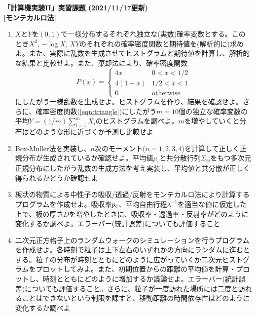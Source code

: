 \documentclass[11pt]{jarticle}
\begin{document}
\noindent
{\bf\large 「計算機実験II」実習課題 (2021/11/17更新)}
\\[-0.5em]

{\bf [モンテカルロ法]}
\begin{enumerate}

\item $X$と$Y$を$(0,1)$で一様分布するそれぞれ独立な(実数)確率変数とする。このとき$X^2$, $-\log X$, $XY$のそれぞれの確率密度関数と期待値を(解析的に)求めよ。また、実際に乱数を生成させてヒストグラムと期待値を計算し、解析的な結果と比較せよ。また、棄却法により、確率密度関数
  \begin{equation}
    P(x) = \begin{cases} 4x & 0 < x < 1/2 \\
      4(1-x) & 1/2 < x < 1 \\
      0 & \text{otherwise}
    \end{cases}
    \label{eqn:triangle}
  \end{equation}
  にしたがう一様乱数を生成せよ。ヒストグラムを作り、結果を確認せよ。さらに、確率密度関数(\ref{eqn:triangle})にしたがう$m=10$個の独立な確率変数の平均$Y=(1/m) \sum_{i=1}^m X_i$のヒストグラムを調べよ。$m$を増やしていくと分布はどのような形に近づくか予測し比較せよ
  
\item Box-Muller法を実装し、$n$次のモーメント($n=1,2,3,4$)を計算して正しく正規分布が生成されているか確認せよ。平均値$\mu_i$と共分散行列$\Sigma_{ij}$をもつ多次元正規分布にしたがう乱数の生成方法を考え実装し、平均値と共分散が正しく得られるかどうか確認せよ

\item 板状の物質による中性子の吸収/透過/反射をモンテカルロ法により計算するプログラムを作成せよ。吸収率$p_{\rm c}$、平均自由行程$\lambda^{-1}$を適当な値に仮定した上で、板の厚さ$D$を増やしたときに、吸収率・透過率・反射率がどのように変化するか調べよ。エラーバー(統計誤差)についても評価すること

\item 二次元正方格子上のランダムウォークのシミュレーションを行うプログラムを作成せよ。各時刻で粒子は上下左右のいずれかの方向にランダムに進むとする。粒子の分布が時刻とともにどのように広がっていくか二次元ヒストグラムをプロットしてみよ。また、初期位置からの距離の平均値を計算・プロットし、時刻とともにどのように増加するか議論せよ。エラーバー(統計誤差)についても評価すること。さらに、粒子が一度訪れた場所には二度と訪れることはできないという制限を課すと、移動距離の時間依存性はどのように変化するか調べよ
  

\end{enumerate}
\end{document}
